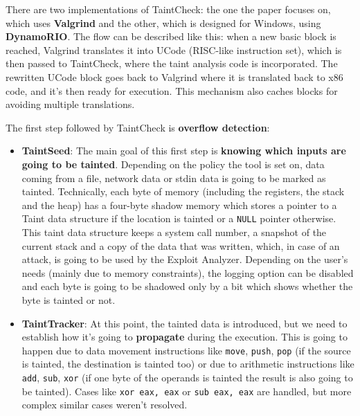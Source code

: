 \documentclass[10pt,a4paper,english,onecolumn]{IEEEtran}
\begin{document}
There are two implementations of TaintCheck: the one the paper focuses on, which uses \textbf{Valgrind} and the other, which is designed for Windows, using \textbf{DynamoRIO}. The flow can be described like this: when a new basic block is reached, Valgrind translates it into UCode (RISC-like instruction set), which is then passed to TaintCheck, where the taint analysis code is incorporated. The rewritten UCode block goes back to Valgrind where it is translated back to x86 code, and it's then ready for execution. This mechanism also caches blocks for avoiding multiple translations.

The first step followed by TaintCheck is \textbf{overflow detection}:

\begin{itemize}
    \item \textbf{TaintSeed}: The main goal of this first step is \textbf{knowing which inputs are going to be tainted}. Depending on the policy the tool is set on, data coming from a file, network data or stdin data is going to be marked as tainted. Technically, each byte of memory (including the registers, the stack and the heap) has a four-byte shadow memory which stores a pointer to a Taint data structure if the location is tainted or a \texttt{NULL} pointer otherwise. This taint data structure keeps a system call number, a snapshot of the current stack and a copy of the data that was written, which, in case of an attack, is going to be used by the Exploit Analyzer. Depending on the user's needs (mainly due to memory constraints), the logging option can be disabled and each byte is going to be shadowed only by a bit which shows whether the byte is tainted or not.
    \item \textbf{TaintTracker}: At this point, the tainted data is introduced, but we need to establish how it's going to \textbf{propagate} during the execution. This is going to happen due to data movement instructions like \texttt{move}, \texttt{push}, \texttt{pop} (if the source is tainted, the destination is tainted too) or due to arithmetic instructions like \texttt{add}, \texttt{sub}, \texttt{xor} (if one byte of the operands is tainted the result is also going to be tainted). Cases like \texttt{xor eax, eax} or \texttt{sub eax, eax} are handled, but more complex similar cases weren't resolved.

\end{itemize}
\end{document}
